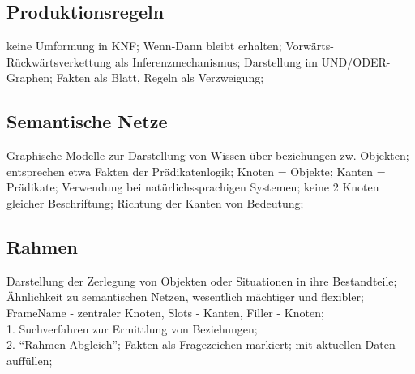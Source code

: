 \documentclass[german,color,6pt]{latex4ei/latex4ei_sheet}
\begin{document}
\begin{sectionbox}
\subsection{Produktionsregeln}
keine Umformung in KNF; Wenn-Dann bleibt erhalten; Vorwärts- Rückwärtsverkettung als Inferenzmechanismus; Darstellung im UND/ODER-Graphen; Fakten als Blatt, Regeln als Verzweigung;

%
\end{sectionbox}

\begin{sectionbox}
\subsection{Semantische Netze}
Graphische Modelle zur Darstellung von Wissen über beziehungen zw. Objekten; entsprechen etwa Fakten der Prädikatenlogik; Knoten = Objekte; Kanten = Prädikate; Verwendung bei natürlichssprachigen Systemen; keine 2 Knoten gleicher Beschriftung; Richtung der Kanten von Bedeutung;
\end{sectionbox}

\begin{sectionbox}
\subsection{Rahmen}
Darstellung der Zerlegung von Objekten oder Situationen in ihre Bestandteile; Ähnlichkeit zu semantischen Netzen, wesentlich mächtiger und flexibler; FrameName - zentraler Knoten, Slots - Kanten, Filler - Knoten; \\
1. Suchverfahren zur Ermittlung von Beziehungen; \\
2. "`Rahmen-Abgleich"'; Fakten als Fragezeichen markiert; mit aktuellen Daten auffüllen;
\end{sectionbox}
\end{document}

